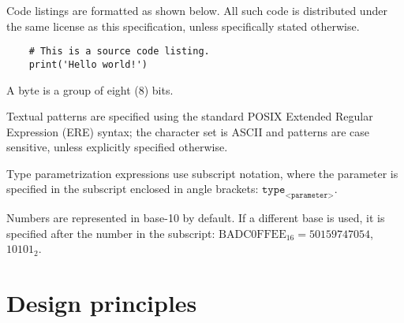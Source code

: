 Code listings are formatted as shown below.
All such code is distributed under the same license as this specification, unless specifically stated otherwise.

\begin{verbatim}
    # This is a source code listing.
    print('Hello world!')
\end{verbatim}

A byte is a group of eight (8) bits.

Textual patterns are specified using the standard
POSIX Extended Regular Expression (ERE) syntax;
the character set is ASCII and patterns are case sensitive, unless explicitly specified otherwise.

Type parametrization expressions use subscript notation,
where the parameter is specified in the subscript enclosed in angle brackets:
$\texttt{type}_\texttt{<parameter>}$.

Numbers are represented in base-10 by default.
If a different base is used, it is specified after the number in the subscript:
$\text{BADC0FFEE}_{16} = 50159747054$, $10101_2$.

\section{Design principles}

